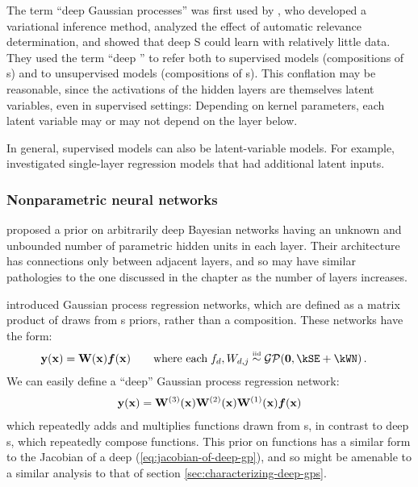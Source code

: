 The term ``deep Gaussian processes'' was first used by \citet{damianou2012deep}, who developed a variational inference method, analyzed the effect of automatic relevance determination, and showed that deep \gp{}S could learn with relatively little data.
%
They used the term ``deep \gp{}'' to refer both to supervised models (compositions of \gp{}s) and to unsupervised models (compositions of \gplvm{}s).
This conflation may be reasonable, since the activations of the hidden layers are themselves latent variables, even in supervised settings:
Depending on kernel parameters, each latent variable may or may not depend on the layer below.

In general, supervised models can also be latent-variable models.
For example, \citet{wang2012gaussian} investigated single-layer \gp{} regression models that had additional latent inputs.

\subsubsection{Nonparametric neural networks}
\citet{adams2010learning} proposed a prior on arbitrarily deep Bayesian networks having an unknown and unbounded number of parametric hidden units in each layer.
Their architecture has connections only between adjacent layers, and so may have similar pathologies to the one discussed in the chapter as the number of layers increases.

\citet{wilson2012gaussian} introduced Gaussian process regression networks, which are defined as a matrix product of draws from \gp{}s priors, rather than a composition.
These networks have the form:
%
\begin{align}
\vy(\vx) & = \vW(\vx) \vf(\vx) \qquad \textnormal{where each} \; f_{d}, W_{d,j} \simiid \GPt{\vzero}{\kSE + \kWN} .
\end{align}
%
We can easily define a ``deep'' Gaussian process regression network:
%
\begin{align}
{\bf{y}}({\bf{x}}) = \mathbf{W}^{(3)}({\bf{x}}) \mathbf{W}^{(2)}({\bf{x}}) \mathbf{W}^{(1)}({\bf{x}}) \boldsymbol{f}({\bf{x}})
\end{align}
%
which repeatedly adds and multiplies functions drawn from \gp{}s, in contrast to deep \gp{}s, which repeatedly compose functions.
This prior on functions has a similar form to the Jacobian of a deep \gp{} (\cref{eq:jacobian-of-deep-gp}), and so might be amenable to a similar analysis to that of section \ref{sec:characterizing-deep-gps}.

